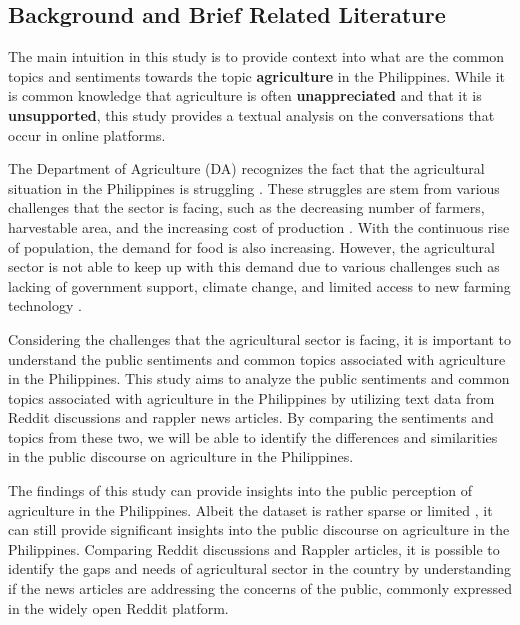 \documentclass[conference]{IEEEtran}
\begin{document}
\subsection{Background and Brief Related Literature}

The main intuition in this study is to provide context into what are the common topics and sentiments towards the topic \textbf{agriculture} in the Philippines.
While it is common knowledge that agriculture is often \textbf{unappreciated} and that it is \textbf{unsupported}, this study provides a textual analysis on the conversations that occur in online platforms. 

\vspace{1em}

The Department of Agriculture (DA) recognizes the fact that the agricultural situation in the Philippines is struggling \cite{a1}. These struggles are stem from various challenges that the sector is facing,
such as the decreasing number of farmers, harvestable area, and the increasing cost of production \cite{a2}. With the continuous rise of population, the demand for food is also increasing. However, the agricultural sector is not able to keep up with this 
demand due to various challenges such as lacking of government support, climate change, and limited access to new farming technology \cite{a2}.

\vspace{1em}

Considering the challenges that the agricultural sector is facing, it is important to understand the public sentiments and common topics associated with agriculture in the Philippines.
This study aims to analyze the public sentiments and common topics associated with agriculture in the Philippines by utilizing text data from Reddit discussions and rappler news articles. 
By comparing the sentiments and topics from these two, we will be able to identify the differences and similarities in the public discourse on agriculture in the Philippines.

\vspace{1em}

The findings of this study can provide insights into the public perception of agriculture in the Philippines. Albeit the dataset is rather sparse or limited , it can still provide significant
insights into the public discourse on agriculture in the Philippines. Comparing Reddit discussions and Rappler articles, it is possible to identify the gaps and needs of agricultural sector in the country 
by understanding if the news articles are addressing the concerns of the public, commonly expressed in the widely open Reddit platform.
\end{document}
